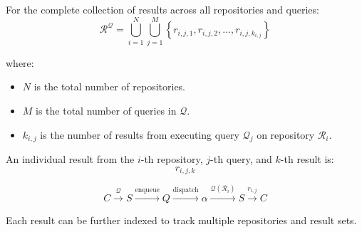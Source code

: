 \documentclass[11pt]{article}
\begin{document}
For the complete collection of results across all repositories and queries:
\[
  \mathcal{R}^{\mathcal{Q}} = \bigcup_{i=1}^{N} \bigcup_{j=1}^{M}
  \left\{ r_{i,j,1}, r_{i,j,2}, \dots, r_{i,j,k_{i,j}} \right\}
\]

where:
\begin{itemize}
\item \(N\) is the total number of repositories.
\item \(M\) is the total number of queries in \(\mathcal{Q}\).
\item \(k_{i,j}\) is the number of results from executing query
  \(\mathcal{Q}_j\)
  on repository \(\mathcal{R}_i\).
\end{itemize}

An individual result from the \(i\)-th repository, \(j\)-th query, and \(k\)-th result is:
\[
  r_{i,j,k}
\]



\[
  C \xrightarrow{\mathcal{Q}} S \xrightarrow{\text{enqueue}} Q \xrightarrow{\text{dispatch}} \alpha \xrightarrow{\mathcal{Q}(\mathcal{R}_i)} S \xrightarrow{r_{i,j}} C
\]

Each result can be further indexed to track multiple repositories and result sets.
\end{document}
